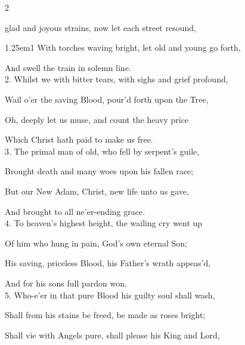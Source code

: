 


\firstEvensong
{}

\firstEvensongHymn

\begin{multicols}{2}
\sloppy

 glad and joyous strains, now let each street resound,


\begin{hangparas}{1.25em}{1}
With torches waving bright, let old and young go forth,

And swell the train in solemn line.\\

2. Whilst we with bitter tears, with sighs and grief profound,

Wail o'er the saving Blood, pour'd forth upon the Tree,

Oh, deeply let us muse, and count the heavy price

Which Christ hath paid to make us free.\\

3. The primal man of old, who fell by serpent's guile,

Brought death and many woes upon his fallen race;

But our New Adam, Christ, new life unto us gave,

And brought to all ne'er-ending grace.\\

4. To heaven's highest height, the wailing cry went up

Of him who hung in pain, God's own eternal Son;

His saving, priceless Blood, his Father's wrath appeas'd,

And for his sons full pardon won.\\

5. Who-e'er in that pure Blood his guilty soul shall wash,

Shall from his stains be freed, be made as roses bright;

Shall vie with Angels pure, shall please his King and Lord,


\end{hangparas}
\end{multicols}
